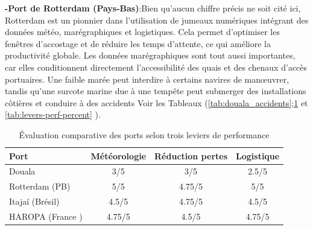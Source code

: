 \documentclass[a4paper,12pt,openany]{report}
\begin{document}
\quad
\textbf{-Port de Rotterdam (Pays-Bas)}:Bien qu’aucun chiffre précis ne soit cité ici, Rotterdam est un pionnier dans l’utilisation de  jumeaux numériques  intégrant des données météo, marégraphiques et logistiques. Cela permet d’optimiser les fenêtres d’accostage et de réduire les temps d’attente, ce qui améliore la productivité globale\cite{Rotterdam2018}.
\quad Les données marégraphiques sont tout aussi importantes, car elles conditionnent directement l’accessibilité des quais et des chenaux d’accès portuaires. Une faible marée peut interdire à certains navires de manœuvrer, tandis qu’une surcote marine due à une tempête peut submerger des installations côtières et conduire à des accidents Voir les Tableaux (\ref{tab:douala_accidents};\ref{tab:comparaison_ports} et \ref{tab:levers-perf-percent} )\cite{Martins2019}.
	\begin{table}[h!]
\caption{Évaluation comparative des ports selon  trois leviers de performance}
	\centering
	
	\begin{tabular}{|l|c|c|c|}
		
		\hline
		\textbf{Port}     & \textbf{Météorologie} & \textbf{Réduction pertes} & \textbf{Logistique} \\
		\hline
		Douala            & 3/5                   & 3/5                        & 2.5/5               \\
		\hline
		Rotterdam (PB)        & 5/5                   & 4.75/5                     & 5/5                 \\
		\hline
		Itajaí  (Brésil)          & 4.5/5                 & 4.75/5                     & 4.5/5               \\
		\hline
		HAROPA  (France )         & 4.75/5                & 4.5/5                      & 4.75/5              \\
		\hline
	\end{tabular}

	\label{tab:comparaison_ports}
\end{table}
\end{document}
